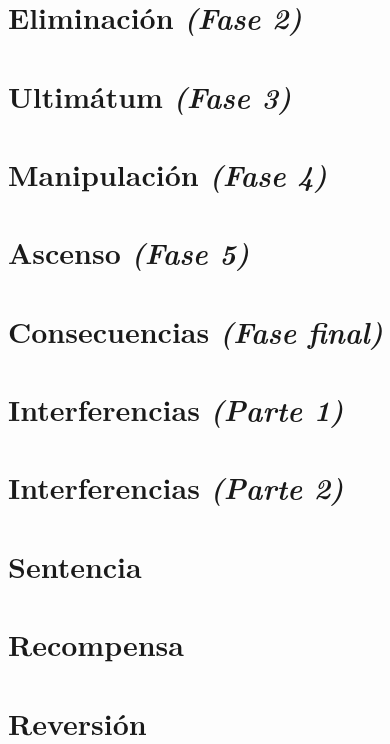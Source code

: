 \documentclass[11pt,a5paper]{book}
\begin{document}
\chapter{Eliminación \emph{\mdseries(Fase 2)}}


\chapter{Ultimátum \emph{\mdseries(Fase 3)}}


\chapter{Manipulación \emph{\mdseries(Fase 4)}}


\chapter{Ascenso \emph{\mdseries(Fase 5)}}


\chapter{Consecuencias \emph{\mdseries(Fase final)}}


\chapter{Interferencias \emph{\mdseries(Parte 1)}}


\chapter{Interferencias \emph{\mdseries(Parte 2)}}


\chapter{Sentencia}


\chapter{Recompensa}


\chapter{Reversión}

\end{document}
